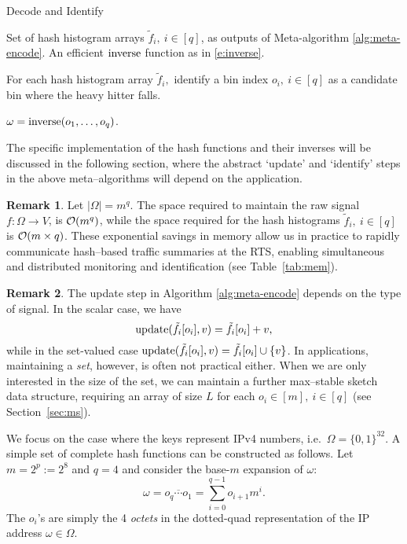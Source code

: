 \documentclass[10pt, conference, letterpaper,onecolumn]{IEEEtranv1.8}
\theoremstyle{plain}\newtheorem{thm}{Theorem}\newtheorem{lem}{Lemma}
\theoremstyle{definition}
\newtheorem{rem}{Remark}
\begin{document}
\begin{algorithm}[t]
\caption{Decode and Identify}
\label{alg:meta-decode}
\begin{algorithmic}[1]
\REQUIRE Set of hash histogram arrays $\tilde f_i,\ i\in [q]$, as outputs of
Meta-algorithm \ref{alg:meta-encode}. An efficient ${\rm inverse}$ function as in \eqref{e:inverse}.

\STATE [Identify] For each hash histogram array $\tilde f_i,$ identify a bin index $o_i,\ i\in [q]$ as a
candidate bin where the heavy hitter falls.
 
\RETURN $\omega = {\rm inverse}(o_1,\ldots,o_q)$.
\end{algorithmic}
\end{algorithm}


\renewcommand{\thealgorithm}{\arabic{algorithm}}

The specific implementation of the hash functions and their inverses will be discussed in the following section, where
the abstract {\rm `update'} and {\rm `identify'} steps in the above meta--algorithms will depend on the application. 


\begin{rem} Let $|\Omega| = m^q$. The space required to maintain the raw signal $f:\Omega\to V$, is
${\cal O}(m^q)$, while the space required for the hash histograms $\tilde f_i,\ i\in[q]$ is ${\cal O}(m\times q)$. These
exponential savings in memory allow us in practice to rapidly communicate hash--based traffic summaries at the RTS, 
enabling simultaneous and distributed monitoring and identification (see Table~\ref{tab:mem}).
\end{rem}

\begin{rem}\label{rem:update} The update step in Algorithm \ref{alg:meta-encode} depends on the type of signal. In the scalar case, we have
$$
{\rm update}( \tilde f_i[o_i], v) = \tilde f_i[o_i] + v,
$$
while in the set-valued case ${\rm update}( \tilde f_i[o_i], v) = \tilde f_i[o_i] \cup\{ v\}$.
In applications, maintaining a {\em set}, however, is often not practical either. When we are only interested in the size of the set, 
we can maintain a further max--stable sketch data structure, requiring an array of size $L$ for each $o_i\in [m],\ 
i\in[q]$ (see Section~\ref{sec:ms}).
\end{rem}


\smallskip
{}
We focus on the case where the keys represent IPv4 numbers, i.e.\ $\Omega = \{0,1\}^{32}$. A simple set of complete
hash functions can be constructed as follows. Let $m = 2^p := 2^8$ and $q = 4$ and consider the base-$m$ expansion of $\omega$:
$$
\omega = \overline{o_q\cdots o_1} = \sum_{i=0}^{q-1} o_{i+1} m^i.
$$
The $o_i$'s are simply the 4 \emph{octets} in the dotted-quad representation of the IP address $\omega\in \Omega$. 
\end{document}
